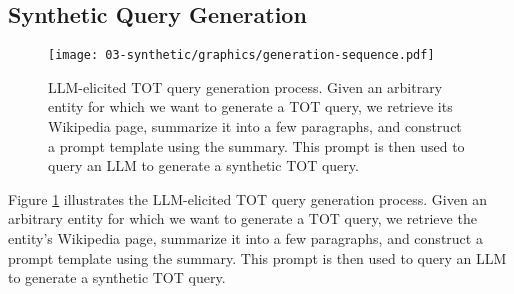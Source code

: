 \subsection{Synthetic Query Generation}


\begin{figure} 
\centering
\texttt{[image: 03-synthetic/graphics/generation-sequence.pdf]}
\caption{
LLM-elicited TOT query generation process. Given an arbitrary entity for which we want to generate a TOT query, we retrieve its Wikipedia page, summarize it into a few paragraphs, and construct a prompt template using the summary. This prompt is then used to query an LLM to generate a synthetic TOT query.
}
\label{fig:query-gen-process}
\end{figure}

Figure \ref{fig:query-gen-process} illustrates the LLM-elicited TOT query generation process. Given an arbitrary entity for which we want to generate a TOT query, we retrieve the entity’s Wikipedia page, summarize it into a few paragraphs, and construct a prompt template using the summary. This prompt is then used to query an LLM to generate a synthetic TOT query.

